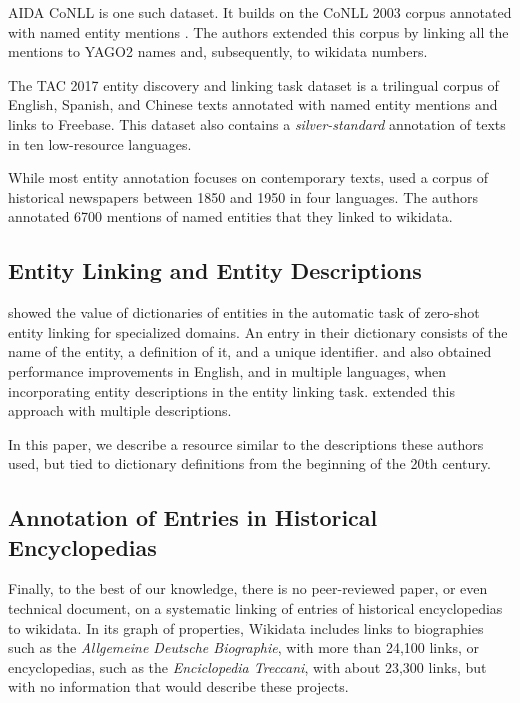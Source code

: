 \documentclass[10pt, a4paper]{article}
\begin{document}
AIDA CoNLL \cite{hoffart2011} is one such dataset. It builds on the CoNLL 2003 corpus annotated with named entity mentions \cite{conll2003}. The authors extended this corpus by linking all the mentions to YAGO2 names and, subsequently, to wikidata numbers. 

The TAC 2017 entity discovery and linking task dataset \cite{TAC2017} is a trilingual corpus of English, Spanish, and Chinese texts annotated with named entity mentions and links to Freebase. This dataset also contains a \textit{silver-standard} annotation of texts in ten low-resource languages.

While most entity annotation focuses on contemporary texts,  used a corpus of historical newspapers between 1850 and 1950 in four languages. The authors annotated 6700 mentions of named entities that they linked to wikidata.

\subsection{Entity Linking and Entity Descriptions}
 showed the value of dictionaries of entities in the automatic task of zero-shot entity linking for specialized domains. An entry in their dictionary consists of the name of the entity, a definition of it, and a unique identifier.  and  also obtained performance improvements in English, and  in multiple languages, when incorporating entity descriptions in the entity linking task.  extended this approach with multiple descriptions. 

In this paper, we describe a resource similar to the descriptions these authors used, but tied to dictionary definitions from the beginning of the 20th century.  


\subsection{Annotation of Entries in Historical Encyclopedias}
Finally, to the best of our knowledge, there is no peer-reviewed paper, or even technical document, on a systematic linking of entries of historical encyclopedias  to wikidata. In its graph of properties, Wikidata includes links to biographies such as the \textit{Allgemeine Deutsche Biographie}, with more than 24,100 links, or encyclopedias, such as the \textit{Enciclopedia Treccani}, with about 23,300 links, but with no information that would describe these projects.
\end{document}
